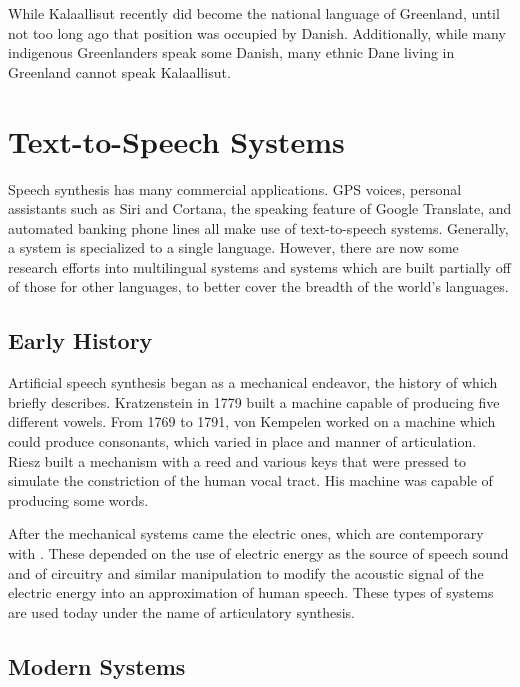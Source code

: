 \documentclass[12pt]{article}
\begin{document}
While Kalaallisut recently did become the national language of Greenland, until not too long ago that position was occupied by Danish. Additionally, while many indigenous Greenlanders speak some Danish, many ethnic Dane living in Greenland cannot speak Kalaallisut. \par

\section{Text-to-Speech Systems}

Speech synthesis has many commercial applications. GPS voices, personal assistants such as Siri and Cortana, the speaking feature of Google Translate, and automated banking phone lines all make use of text-to-speech systems.  Generally, a system is specialized to a single language. However, there are now some research efforts into multilingual systems and systems which are built partially off of those for other languages, to better cover the breadth of the world's languages.\par

	\subsection{Early History}

	Artificial speech synthesis began as a mechanical endeavor, the history of which \citet{old_flanagan} briefly describes. Kratzenstein in 1779 built a machine capable of producing five different vowels. From 1769 to 1791, von Kempelen worked on a machine which could produce consonants, which varied in place and manner of articulation. Riesz built a mechanism with a reed and various keys that were pressed to simulate the constriction of the human vocal tract. His machine was capable of producing some words. \par

	After the mechanical systems came the electric ones, which are contemporary with \citet{old_flanagan}. These depended on the use of electric energy as the source of speech sound and of circuitry and similar manipulation to modify the acoustic signal of the electric energy into an approximation of human speech. These types of systems are used today under the name of articulatory synthesis. \par

	\subsection{Modern Systems}
\end{document}
